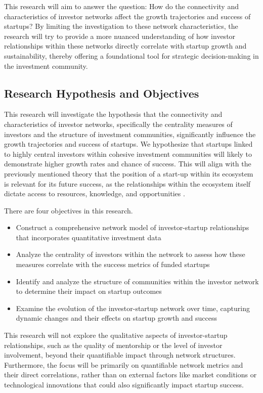 \documentclass[a4paper,11pt]{article}
\begin{document}
This research will aim to answer the question: How do the connectivity and characteristics of investor networks affect the growth trajectories and success of startups? By limiting the investigation to these network characteristics, the research will try to provide a more nuanced understanding of how investor relationships within these networks directly correlate with startup growth and sustainability, thereby offering a foundational tool for strategic decision-making in the investment community.

\subsection{Research Hypothesis and Objectives}
This research will investigate the hypothesis that the connectivity and characteristics of investor networks, specifically the centrality measures of investors and the structure of investment communities, significantly influence the growth trajectories and success of startups. We hypothesize that startups linked to highly central investors within cohesive investment communities will likely to demonstrate higher growth rates and chance of success. This will align with the previously mentioned theory that the position of a start-up within its ecosystem is relevant for its future success, as the relationships within the ecosystem itself dictate access to resources, knowledge, and opportunities \cite{bonaventura2020a}.

There are four objectives in this research. 
\begin{itemize}
    \item Construct a comprehensive network model of investor-startup relationships that incorporates quantitative investment data
    \item Analyze the centrality of investors within the network to assess how these measures correlate with the success metrics of funded startups
    \item Identify and analyze the structure of communities within the investor network to determine their impact on startup outcomes
    \item Examine the evolution of the investor-startup network over time, capturing dynamic changes and their effects on startup growth and success
\end{itemize}

This research will not explore the qualitative aspects of investor-startup relationships, such as the quality of mentorship or the level of investor involvement, beyond their quantifiable impact through network structures. Furthermore, the focus will be primarily on quantifiable network metrics and their direct correlations, rather than on external factors like market conditions or technological innovations that could also significantly impact startup success.
\end{document}
